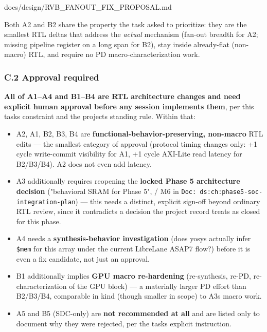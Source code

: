 \begin{relocated}{docs/design/RVB_FANOUT_FIX_PROPOSAL.md}
{}

Both A2 and B2 share the property the task asked to prioritize: they are
the smallest RTL deltas that address the \emph{actual} mechanism
(fan-out breadth for A2; missing pipeline register on a long span for
B2), stay inside already-flat (non-macro) RTL, and require no PD
macro-characterization work.

\subsubsection{C.2 Approval required}\label{tm:pd:rvb-fanout-fix:c2-approval-required}

\textbf{All of A1--A4 and B1--B4 are RTL architecture changes and need
explicit human approval before any 
session implements them}, per this task\textquotesingle s constraint and
the project\textquotesingle s standing rule. Within that:

\begin{itemize}
\tightlist
\item
  A2, A1, B2, B3, B4 are \textbf{functional-behavior-preserving,
  non-macro} RTL edits --- the smallest category of approval (protocol
  timing changes only: +1 cycle write-commit visibility for A1, +1 cycle
  AXI-Lite read latency for B2/\allowbreak{}B3/\allowbreak{}B4). A2 does
  not even add latency.
\item
  A3 additionally requires reopening the \textbf{locked Phase 5
  architecture decision} ("behavioral SRAM for Phase 5", 
  / M6 in
  \texttt{Doc:\allowbreak{}\ ds:\allowbreak{}ch:\allowbreak{}phase5-\allowbreak{}soc-\allowbreak{}integration-\allowbreak{}plan})
  --- this needs a distinct, explicit sign-off beyond ordinary RTL
  review, since it contradicts a decision the project record treats as
  closed for this phase.
\item
  A4 needs a \textbf{synthesis-behavior investigation} (does yosys
  actually infer \texttt{\$mem} for this array under the current
  LibreLane ASAP7 flow?) before it is even a fix candidate, not just an
  approval.
\item
  B1 additionally implies \textbf{GPU macro re-hardening} (re-synthesis,
  re-PD, re-characterization of the GPU block) --- a materially larger
  PD effort than B2/B3/B4, comparable in kind (though smaller in scope)
  to A3\textquotesingle s macro work.
\item
  A5 and B5 (SDC-only) are \textbf{not recommended at all} and are
  listed only to document why they were rejected, per the
  task\textquotesingle s explicit instruction.
\end{itemize}


\end{relocated}
